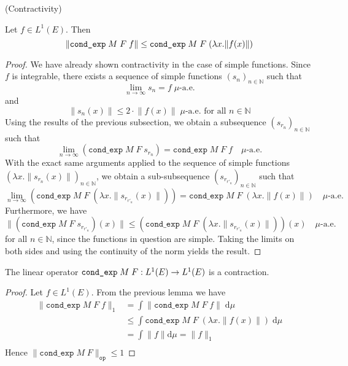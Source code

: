 \begin{lemma} (Contractivity) \par
	Let $f \in L^1(E)$. Then
	\[
		\normalfont\lVert \texttt{cond\_exp} \; M \; F \; f \rVert \le \texttt{cond\_exp} \; M \; F \; (\lambda x. \lVert f(x) \rVert)
	\]
\end{lemma}
\begin{proof}
	We have already shown contractivity in the case of simple functions. Since $f$ is integrable, there exists a sequence of simple functions $(s_n)_{n \in \mathbb{N}}$ such that
	\[
		\lim_{n \rightarrow \infty} s_n= f \; \mu\textrm{-a.e.}
	\]
	and
	\[
		\lVert s_n(x) \rVert \le 2 \cdot \lVert f(x) \rVert \; \mu\textrm{-a.e. for all } n \in \mathbb{N}
	\]
	Using the results of the previous subsection, we obtain a subsequence $(s_{r_n})_{n \in \mathbb{N}}$ such that
	\[
		\lim_{n \rightarrow \infty} (\texttt{cond\_exp} \; M \; F \; s_{r_n}) = \texttt{cond\_exp} \; M \; F \; f \quad \mu\textrm{-a.e.}
	\]
	With the exact same arguments applied to the sequence of simple functions $(\lambda x. \lVert s_{r_n}(x) \rVert)_{n \in \mathbb{N}}$, we obtain a sub-subsequence $(s_{r_{r'_n}})_{n \in \mathbb{N}}$ such that
	\[
		\lim_{n \rightarrow \infty} (\texttt{cond\_exp} \; M \; F \; (\lambda x. \lVert s_{r_{r'_n}}(x) \rVert)) = \texttt{cond\_exp} \; M \; F \; (\lambda x. \lVert f(x)\rVert) \quad\mu\textrm{-a.e.}
	\]
	Furthermore, we have
	\[
		\lVert (\texttt{cond\_exp} \; M \; F \; s_{r_{r'_n}})(x) \rVert \le (\texttt{cond\_exp} \; M \; F \; (\lambda x. \lVert s_{r_{r'_n}}(x) \rVert))(x) \quad\mu\textrm{-a.e.}
	\]
	for all $n \in \mathbb{N}$, since the functions in question are simple. Taking the limits on both sides and using the continuity of the norm yields the result.
\end{proof}

\begin{corollary}
	The linear operator $\normalfont\texttt{cond\_exp} \; M \; F : L^1(E) \rightarrow L^1(E)$ is a contraction.
\end{corollary}
\begin{proof}
	Let $f \in L^1(E)$. From the previous lemma we have 
	\begin{align*}
		\lVert \texttt{cond\_exp} \; M \; F \; f \rVert_1 &= \int \lVert \texttt{cond\_exp} \; M \; F \; f \rVert \; \textrm{d} \mu \\
		&\le \int \texttt{cond\_exp} \; M \; F \; (\lambda x. \lVert f(x) \rVert) \; \textrm{d} \mu \\
		&= \int \lVert f \rVert \textrm{d} \mu = \lVert f \rVert_1\\
	\end{align*}
	Hence $\lVert \texttt{cond\_exp} \; M \; F \rVert_{\texttt{op}} \le 1$
\end{proof}

